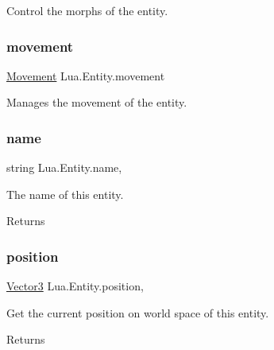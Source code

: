 Control the morphs of the entity. 

\mbox{\label{class_lua_1_1_entity_a2845d63d6164b33ee49f760211fa4116}} 
\subsubsection{\texorpdfstring{movement}{movement}}
{\footnotesize\ttfamily \mbox{\hyperlink{class_lua_1_1_movement}{Movement}} Lua.\+Entity.\+movement\hspace{0.3cm}{\ttfamily [get]}}



Manages the movement of the entity. 

\mbox{\label{class_lua_1_1_entity_a8155b6c6ef0f0630ec7e818dd4cdaec4}} 
\subsubsection{\texorpdfstring{name}{name}}
{\footnotesize\ttfamily string Lua.\+Entity.\+name\hspace{0.3cm}{\ttfamily [get]}, {\ttfamily [set]}}



The name of this entity. 

\begin{DoxyReturn}{Returns}

\end{DoxyReturn}
\mbox{\label{class_lua_1_1_entity_ad8bd97d98fddc9b89f8410512b502c3f}} 
\subsubsection{\texorpdfstring{position}{position}}
{\footnotesize\ttfamily \mbox{\hyperlink{class_lua_1_1_vector3}{Vector3}} Lua.\+Entity.\+position\hspace{0.3cm}{\ttfamily [get]}, {\ttfamily [set]}}



Get the current position on world space of this entity. 

\begin{DoxyReturn}{Returns}

\end{DoxyReturn}
\mbox{\label{class_lua_1_1_entity_a56d48f666679b251eefa10e6f65bbb60}} 
